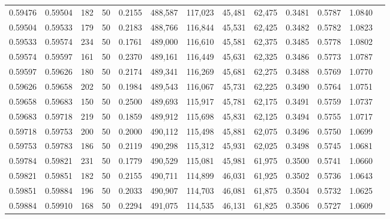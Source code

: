 \begin{tabular}{rrrrrrrrrrrrr}
0.59476 & 0.59504 &   182 &  50 &                                     0.2155 & 488,587 & 117,023 &  45,481 &  62,475 & 0.3481 & 0.5787 & 1.0840 \\
0.59504 & 0.59533 &   179 &  50 &                                     0.2183 & 488,766 & 116,844 &  45,531 &  62,425 & 0.3482 & 0.5782 & 1.0823 \\
0.59533 & 0.59574 &   234 &  50 &                                     0.1761 & 489,000 & 116,610 &  45,581 &  62,375 & 0.3485 & 0.5778 & 1.0802 \\
0.59574 & 0.59597 &   161 &  50 &                                     0.2370 & 489,161 & 116,449 &  45,631 &  62,325 & 0.3486 & 0.5773 & 1.0787 \\
0.59597 & 0.59626 &   180 &  50 &                                     0.2174 & 489,341 & 116,269 &  45,681 &  62,275 & 0.3488 & 0.5769 & 1.0770 \\
0.59626 & 0.59658 &   202 &  50 &                                     0.1984 & 489,543 & 116,067 &  45,731 &  62,225 & 0.3490 & 0.5764 & 1.0751 \\
0.59658 & 0.59683 &   150 &  50 &                                     0.2500 & 489,693 & 115,917 &  45,781 &  62,175 & 0.3491 & 0.5759 & 1.0737 \\
0.59683 & 0.59718 &   219 &  50 &                                     0.1859 & 489,912 & 115,698 &  45,831 &  62,125 & 0.3494 & 0.5755 & 1.0717 \\
0.59718 & 0.59753 &   200 &  50 &                                     0.2000 & 490,112 & 115,498 &  45,881 &  62,075 & 0.3496 & 0.5750 & 1.0699 \\
0.59753 & 0.59783 &   186 &  50 &                                     0.2119 & 490,298 & 115,312 &  45,931 &  62,025 & 0.3498 & 0.5745 & 1.0681 \\
0.59784 & 0.59821 &   231 &  50 &                                     0.1779 & 490,529 & 115,081 &  45,981 &  61,975 & 0.3500 & 0.5741 & 1.0660 \\
0.59821 & 0.59851 &   182 &  50 &                                     0.2155 & 490,711 & 114,899 &  46,031 &  61,925 & 0.3502 & 0.5736 & 1.0643 \\
0.59851 & 0.59884 &   196 &  50 &                                     0.2033 & 490,907 & 114,703 &  46,081 &  61,875 & 0.3504 & 0.5732 & 1.0625 \\
0.59884 & 0.59910 &   168 &  50 &                                     0.2294 & 491,075 & 114,535 &  46,131 &  61,825 & 0.3506 & 0.5727 & 1.0609 \\

\end{tabular}
